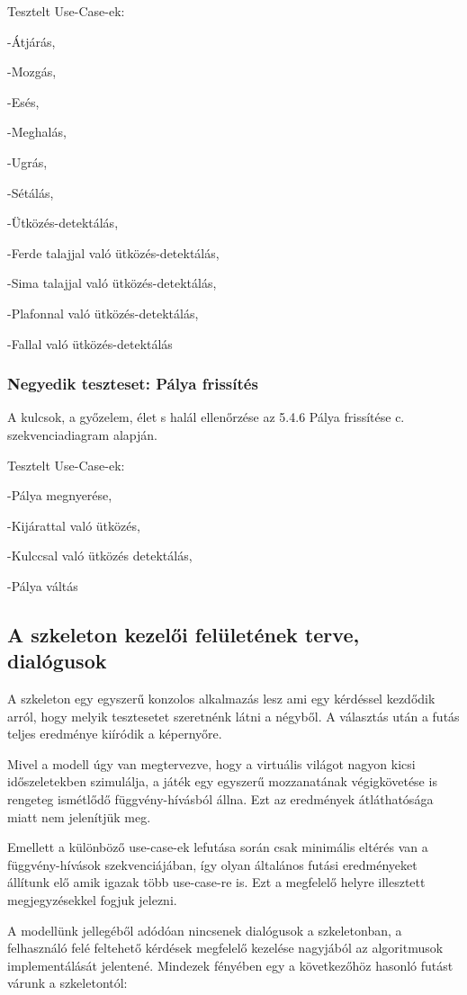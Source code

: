 	Tesztelt Use-Case-ek: 
	
	-Átjárás, 
	
	-Mozgás, 
	
	-Esés, 
	
	-Meghalás, 
	
	-Ugrás, 
	
	-Sétálás, 
	
	-Ütközés-detektálás, 
	
	-Ferde talajjal való ütközés-detektálás, 
	
	-Sima talajjal való ütközés-detektálás, 
	
	-Plafonnal való ütközés-detektálás, 
	
	-Fallal való ütközés-detektálás
	
	\subsubsection{Negyedik teszteset: Pálya frissítés}
	A kulcsok, a győzelem, élet s halál ellenőrzése az 5.4.6 Pálya frissítése c. szekvenciadiagram alapján.
	
	Tesztelt Use-Case-ek: 
	
	-Pálya megnyerése, 
	
	-Kijárattal való ütközés, 
	
	-Kulccsal való ütközés detektálás, 
	
	-Pálya váltás
	
\subsection{A szkeleton kezelői felületének terve, dialógusok}

A szkeleton egy egyszerű konzolos alkalmazás lesz ami egy kérdéssel kezdődik arról, hogy melyik tesztesetet szeretnénk látni a négyből. A választás után a futás teljes eredménye kiíródik a képernyőre.

Mivel a modell úgy van megtervezve, hogy a virtuális világot nagyon kicsi időszeletekben szimulálja, a játék egy egyszerű mozzanatának végigkövetése is rengeteg ismétlődő függvény-hívásból állna. Ezt az eredmények átláthatósága miatt nem jelenítjük meg.

Emellett a különböző use-case-ek lefutása során csak minimális eltérés van a függvény-hívások szekvenciájában, így olyan általános futási eredményeket állítunk elő amik igazak több use-case-re is. Ezt a megfelelő helyre illesztett megjegyzésekkel fogjuk jelezni.

A modellünk jellegéből adódóan nincsenek dialógusok a szkeletonban, a felhasználó felé feltehető kérdések megfelelő kezelése nagyjából az algoritmusok implementálását jelentené. Mindezek fényében egy a következőhöz hasonló futást várunk a szkeletontól:


